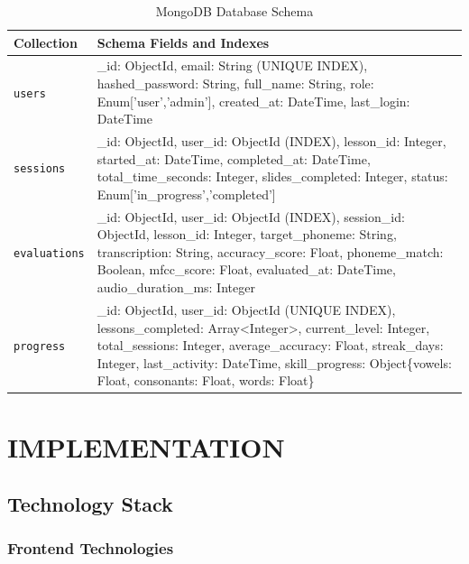 \documentclass[12pt,a4paper]{article}
\begin{document}
\begin{table}[H]
\centering
\caption{MongoDB Database Schema}
\label{tab:database_schema}
\tiny
\begin{tabular}{p{2.5cm}p{11cm}}
\toprule
\textbf{Collection} & \textbf{Schema Fields and Indexes} \\
\midrule
\texttt{users} & \_id: ObjectId, email: String (UNIQUE INDEX), hashed\_password: String, full\_name: String, role: Enum['user','admin'], created\_at: DateTime, last\_login: DateTime \\
\hline
\texttt{sessions} & \_id: ObjectId, user\_id: ObjectId (INDEX), lesson\_id: Integer, started\_at: DateTime, completed\_at: DateTime, total\_time\_seconds: Integer, slides\_completed: Integer, status: Enum['in\_progress','completed'] \\
\hline
\texttt{evaluations} & \_id: ObjectId, user\_id: ObjectId (INDEX), session\_id: ObjectId, lesson\_id: Integer, target\_phoneme: String, transcription: String, accuracy\_score: Float, phoneme\_match: Boolean, mfcc\_score: Float, evaluated\_at: DateTime, audio\_duration\_ms: Integer \\
\hline
\texttt{progress} & \_id: ObjectId, user\_id: ObjectId (UNIQUE INDEX), lessons\_completed: Array<Integer>, current\_level: Integer, total\_sessions: Integer, average\_accuracy: Float, streak\_days: Integer, last\_activity: DateTime, skill\_progress: Object\{vowels: Float, consonants: Float, words: Float\} \\
\bottomrule
\end{tabular}
\end{table}

\section{IMPLEMENTATION}

\subsection{Technology Stack}

\subsubsection{Frontend Technologies}
\end{document}
